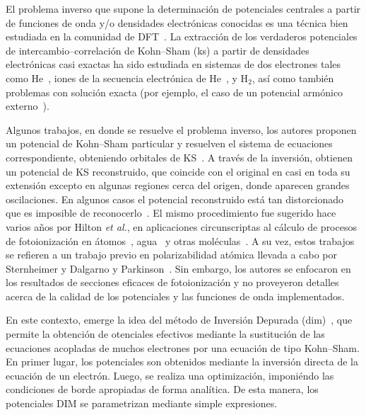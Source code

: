 El problema inverso que supone la determinación de potenciales centrales 
a partir de funciones de onda y/o densidades electrónicas conocidas es 
una técnica bien estudiada en la comunidad de 
DFT~\cite{Wu:03,Gaiduk:13,Ryabinkin:15}. La extracción de los verdaderos
potenciales de intercambio--correlación de Kohn--Sham (\acs{ks}) a partir de 
densidades electrónicas casi exactas ha sido estudiada en sistemas de 
dos electrones tales como He~\cite{Mura:97}, iones de la secuencia 
electrónica de He~\cite{Umrigar:94}, y H$_2$\cite{Gritsenko:97,Mura:97},
así como también problemas con solución exacta (por ejemplo, el caso de
un potencial armónico externo~\cite{Filippi:94}).

Algunos trabajos, en donde se resuelve el problema inverso, los autores 
proponen un potencial de Kohn--Sham particular y resuelven el sistema
de ecuaciones correspondiente, obteniendo orbitales de 
KS~\cite{Schipper:97,deSilva:12,Kananenka:13}. A través de la inversión,
obtienen un potencial de KS reconstruido, que coincide con el original
en casi en toda su extensión excepto en algunas regiones cerca del 
origen, donde aparecen grandes oscilaciones. En algunos casos el 
potencial reconstruido está tan distorcionado que es imposible de 
reconocerlo~\cite{Mura:97,Jacob:11}. El mismo procedimiento fue 
sugerido hace varios años por Hilton \textit{et al.}, en aplicaciones
circunscriptas al cálculo de procesos de fotoionización en 
átomos~\cite{Hilton:77,Suzer:77}, agua~\cite{Hilton:79} y otras 
moléculas~\cite{Hilton:80,Crljen:87}. A su vez, estos trabajos se 
refieren a un trabajo previo en polarizabilidad atómica llevada a cabo 
por Sternheimer\cite{Sternheimer:54} y Dalgarno y 
Parkinson~\cite{Dalgarno:59}. Sin embargo, los autores se enfocaron en 
los resultados de secciones eficaces de fotoionización y no proveyeron 
detalles acerca de la calidad de los potenciales y las funciones de 
onda implementados.

En este contexto, emerge la idea del método de Inversión Depurada 
(\acs{dim})~\cite{Mendez:16,Mendez:18}, que permite la obtención de 
otenciales efectivos mediante la sustitución de las ecuaciones acopladas 
de muchos electrones por una ecuación de tipo Kohn--Sham. En primer 
lugar, los potenciales son obtenidos mediante la inversión directa de 
la ecuación de un electrón. Luego, se realiza una optimización, 
imponiéndo las condiciones de borde apropiadas de forma analítica. De 
esta manera, los potenciales DIM se parametrizan mediante simple 
expresiones.


